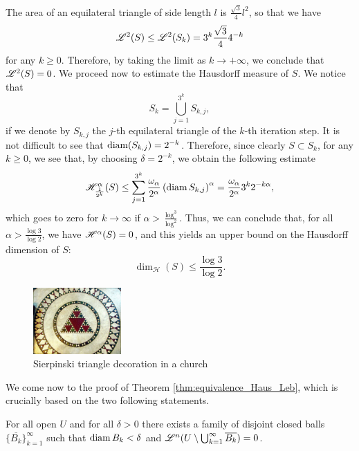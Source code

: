 \begin{example}
The area of an equilateral triangle of side length $l$ is $\frac{\sqrt{3}}{4} l^2$, so that we have
\begin{equation*}
\mathscr{L}^{2}(S) \le \mathscr{L}^{2}(S_{k}) = 3^{k} \frac{\sqrt{3}}{4} 4^{-k}
\end{equation*}
for any $k \ge 0$. Therefore, by taking the limit as $k \to + \infty$, we conclude that $\mathscr{L}^{2}(S) = 0$. We proceed now to estimate the Hausdorff measure of $S$. We notice that $$S_{k} = \bigcup_{j = 1}^{3^{k}} S_{k, j},$$ if we denote by $S_{k, j}$ the $j$-th equilateral triangle of the $k$-th iteration step. It is not difficult to see that $\operatorname{diam}(S_{k, j}) = 2^{-k}$. Therefore, since clearly $S \subset S_{k}$, for any $k \ge 0$, we see that, by choosing $\delta = 2^{-k}$, we obtain the following estimate
\[
\mathscr{H}^{\alpha}_{\frac{1}{2^k}}(S) 
\leq \sum_{j=1}^{3^k}
\frac{\omega_\alpha}{2^\alpha} 
\left(\operatorname{diam} S_{k,j} \right)^\alpha 
= \frac{\omega_\alpha}{2^\alpha} 3^k 2^{-k\alpha},
\]
which goes to zero for $k\to \infty$ if $\alpha >
\frac{\log^3}{\log^2}$. Thus, we can conclude that, for all $\alpha > \frac{\log{3}}{\log{2}}$, we
have $\mathscr{H}^{\alpha}(S) = 0$, and this yields an upper bound on the Hausdorff dimension of $S$:
\[
\dim_{\mathcal{H}}(S) \leq \frac{\log 3}{\log 2}.
\]

\begin{figure}[!ht]
\caption{Sierpinski triangle decoration in a church}
\centering
\includegraphics[width=0.3\textwidth]{sierpinski_triangle_decoration.jpg}
\end{figure}
\end{example}

We come now to the proof of Theorem \ref{thm:equivalence_Haus_Leb}, which is crucially based on the two following statements.

\begin{lemma}
\label{lemmaVitaliCovering}
For all open $U$ and for all $\delta > 0$ there exists a family of disjoint
closed balls $\{\overline{B_k}\}_{k=1}^\infty$ such that $\operatorname{diam} B_k < \delta$ and
$\mathscr{L}^{n}(U \setminus \bigcup_{k=1}^\infty \overline{B_k}) = 0$.
\end{lemma}

